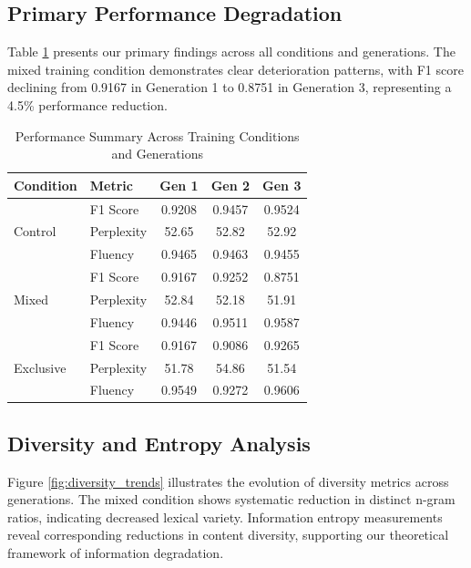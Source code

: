 \documentclass{article}
\begin{document}
\subsection{Primary Performance Degradation}

Table \ref{tab:performance_summary} presents our primary findings across all conditions and generations. The mixed training condition demonstrates clear deterioration patterns, with F1 score declining from 0.9167 in Generation 1 to 0.8751 in Generation 3, representing a 4.5\% performance reduction.

\begin{table}[H]
\centering
\caption{Performance Summary Across Training Conditions and Generations}
\label{tab:performance_summary}
\begin{tabular}{llccc}
\toprule
\textbf{Condition} & \textbf{Metric} & \textbf{Gen 1} & \textbf{Gen 2} & \textbf{Gen 3} \\
\midrule
\multirow{3}{*}{Control} & F1 Score & 0.9208 & 0.9457 & 0.9524 \\
 & Perplexity & 52.65 & 52.82 & 52.92 \\
 & Fluency & 0.9465 & 0.9463 & 0.9455 \\
\midrule
\multirow{3}{*}{Mixed} & F1 Score & 0.9167 & 0.9252 & 0.8751 \\
 & Perplexity & 52.84 & 52.18 & 51.91 \\
 & Fluency & 0.9446 & 0.9511 & 0.9587 \\
\midrule
\multirow{3}{*}{Exclusive} & F1 Score & 0.9167 & 0.9086 & 0.9265 \\
 & Perplexity & 51.78 & 54.86 & 51.54 \\
 & Fluency & 0.9549 & 0.9272 & 0.9606 \\
\bottomrule
\end{tabular}
\end{table}

\subsection{Diversity and Entropy Analysis}

Figure \ref{fig:diversity_trends} illustrates the evolution of diversity metrics across generations. The mixed condition shows systematic reduction in distinct n-gram ratios, indicating decreased lexical variety. Information entropy measurements reveal corresponding reductions in content diversity, supporting our theoretical framework of information degradation.
\end{document}
